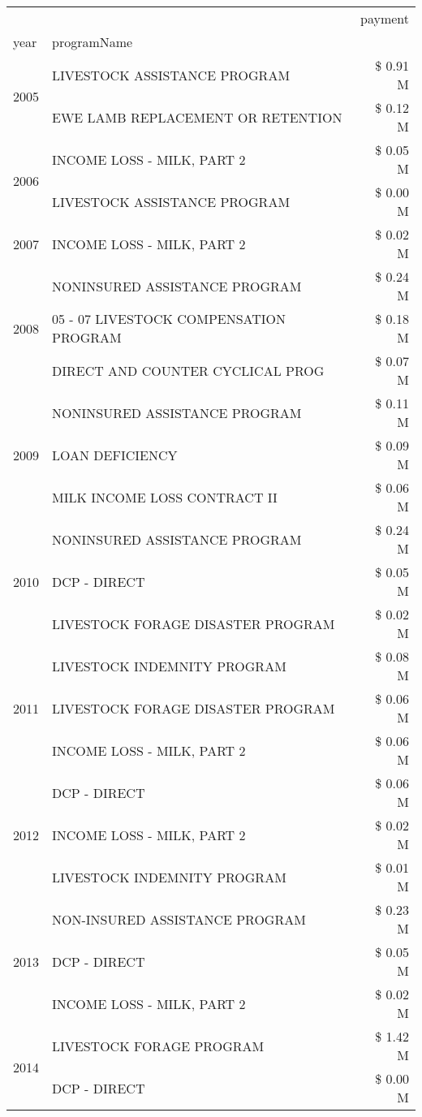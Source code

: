\begin{tabular}{llr}
\toprule
 &  & payment \\
year & programName &  \\
\midrule
\multirow[t]{2}{*}{2005} & LIVESTOCK ASSISTANCE PROGRAM & \$ 0.91 M \\
 & EWE LAMB REPLACEMENT OR RETENTION & \$ 0.12 M \\
\cline{1-3}
\multirow[t]{2}{*}{2006} & INCOME LOSS - MILK, PART 2 & \$ 0.05 M \\
 & LIVESTOCK ASSISTANCE PROGRAM & \$ 0.00 M \\
\cline{1-3}
2007 & INCOME LOSS - MILK, PART 2 & \$ 0.02 M \\
\cline{1-3}
\multirow[t]{3}{*}{2008} & NONINSURED ASSISTANCE PROGRAM & \$ 0.24 M \\
 & 05 - 07 LIVESTOCK COMPENSATION PROGRAM & \$ 0.18 M \\
 & DIRECT AND COUNTER CYCLICAL PROG & \$ 0.07 M \\
\cline{1-3}
\multirow[t]{3}{*}{2009} & NONINSURED ASSISTANCE PROGRAM & \$ 0.11 M \\
 & LOAN DEFICIENCY & \$ 0.09 M \\
 & MILK INCOME LOSS CONTRACT II & \$ 0.06 M \\
\cline{1-3}
\multirow[t]{3}{*}{2010} & NONINSURED ASSISTANCE PROGRAM & \$ 0.24 M \\
 & DCP - DIRECT & \$ 0.05 M \\
 & LIVESTOCK FORAGE DISASTER PROGRAM & \$ 0.02 M \\
\cline{1-3}
\multirow[t]{3}{*}{2011} & LIVESTOCK INDEMNITY PROGRAM & \$ 0.08 M \\
 & LIVESTOCK FORAGE DISASTER PROGRAM & \$ 0.06 M \\
 & INCOME LOSS - MILK, PART 2 & \$ 0.06 M \\
\cline{1-3}
\multirow[t]{3}{*}{2012} & DCP - DIRECT & \$ 0.06 M \\
 & INCOME LOSS - MILK, PART 2 & \$ 0.02 M \\
 & LIVESTOCK INDEMNITY PROGRAM & \$ 0.01 M \\
\cline{1-3}
\multirow[t]{3}{*}{2013} & NON-INSURED ASSISTANCE PROGRAM & \$ 0.23 M \\
 & DCP - DIRECT & \$ 0.05 M \\
 & INCOME LOSS - MILK, PART 2 & \$ 0.02 M \\
\cline{1-3}
\multirow[t]{2}{*}{2014} & LIVESTOCK FORAGE PROGRAM & \$ 1.42 M \\
 & DCP - DIRECT & \$ 0.00 M \\

\end{tabular}
